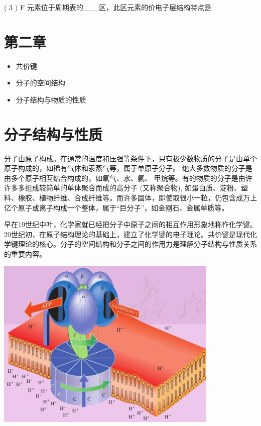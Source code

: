 \documentclass[10pt]{article}
\begin{document}
( 3 ) F 元素位于周期表的\_\_\_区，此区元素的价电子层结构特点是

\section*{第二章}

\begin{mdframed}

\begin{itemize}
\item 共价键
\end{itemize}

\begin{itemize}
\item 分子的空间结构
\end{itemize}

\begin{itemize}
\item 分子结构与物质的性质
\end{itemize}

\end{mdframed}

\section*{分子结构与性质}

分子由原子构成。在通常的温度和压强等条件下，只有极少数物质的分子是由单个原子构成的，如稀有气体和汞蒸气等，属于单原子分子。 绝大多数物质的分子是由多个原子相互结合构成的，如氧气、水、氨、 甲烷等。有的物质的分子是由许许多多组成较简单的单体聚合而成的高分子 (又称聚合物), 如蛋白质、淀粉、塑料、橡胶、植物纤维、合成纤维等。而许多固体，即使取很小一粒，仍包含成万上亿个原子或离子构成一个整体，属于“巨分子”，如金刚石、金属单质等。

早在19世纪中叶，化学家就已经把分子中原子之间的相互作用形象地称作化学键。20世纪初，在原子结构理论的基础上，建立了化学键的电子理论。共价键是现代化学键理论的核心。分子的空间结构和分子之间的作用力是理解分子结构与性质关系的重要内容。

\begin{center}
\includegraphics[max width=0.8\textwidth]{images/0190e026-5a11-7df7-bd27-54d09026ba7a_36_355529.jpg}
\end{center}
\end{document}
